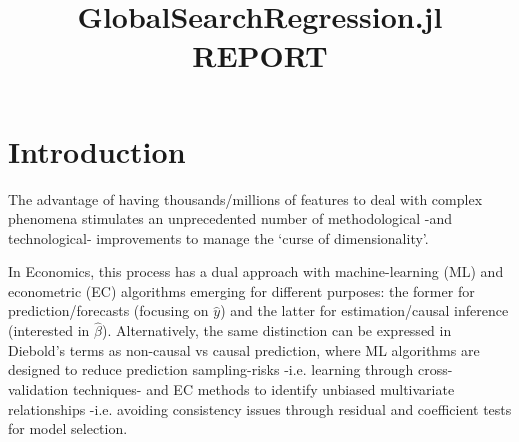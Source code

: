 \documentclass{article}
\title{GlobalSearchRegression.jl \\
       \vspace{5mm} REPORT}
\begin{document}
\maketitle

\vspace{5mm}
\tableofcontents
\clearpage


\section{Introduction}
The advantage of having thousands/millions of features to deal with complex phenomena stimulates an unprecedented number of methodological -and technological- improvements to manage the ‘curse of dimensionality’. 

In Economics, this process has a dual approach with machine-learning (ML) and econometric (EC) algorithms emerging for different purposes: the former for prediction/forecasts (focusing on $\hat{y}$) and the latter for estimation/causal inference (interested in $\hat{\beta}$). Alternatively, the same distinction can be expressed in Diebold’s terms as non-causal vs causal prediction, where ML algorithms are designed to reduce prediction sampling-risks -i.e. learning through cross-validation techniques- and EC methods to identify unbiased multivariate relationships -i.e. avoiding consistency issues through residual and coefficient tests for model selection. 
\end{document}
